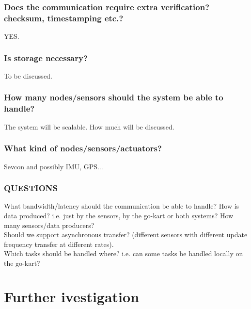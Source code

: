 \subsubsection{Does the communication require extra verification? checksum, timestamping etc.?}
YES.

\subsubsection{Is storage necessary?}
To be discussed.

\subsubsection{How many nodes/sensors should the system be able to handle?}
The system will be scalable. How much will be discussed.

\subsubsection{What kind of nodes/sensors/actuators?}
Sevcon and possibly IMU, GPS...

\subsubsection{QUESTIONS}
What bandwidth/latency should the communication be able to handle?
How is data produced? i.e. just by the sensors, by the go-kart or both systems?
How many sensors/data producers?\\
Should we support asynchronous transfer? (different sensors with different 
update frequency transfer at different rates).\\
Which tasks should be handled where? i.e. can some tasks be handled locally on 
the go-kart?



\section{Further ivestigation}
